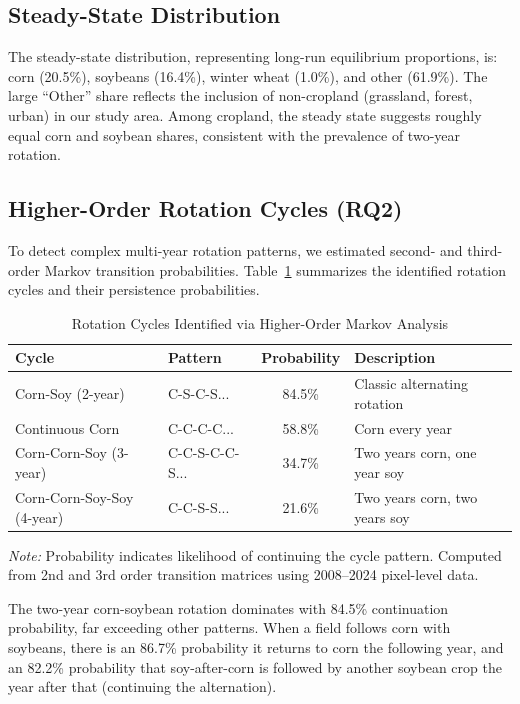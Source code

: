 \documentclass[12pt, a4paper]{article}
\begin{document}
\subsection{Steady-State Distribution}

The steady-state distribution, representing long-run equilibrium proportions, is: corn (20.5\%), soybeans (16.4\%), winter wheat (1.0\%), and other (61.9\%). The large ``Other'' share reflects the inclusion of non-cropland (grassland, forest, urban) in our study area. Among cropland, the steady state suggests roughly equal corn and soybean shares, consistent with the prevalence of two-year rotation.

\subsection{Higher-Order Rotation Cycles (RQ2)}

To detect complex multi-year rotation patterns, we estimated second- and third-order Markov transition probabilities. Table~\ref{tab:rotation_cycles} summarizes the identified rotation cycles and their persistence probabilities.

\begin{table}[H]
\centering
\caption{Rotation Cycles Identified via Higher-Order Markov Analysis}
\label{tab:rotation_cycles}
\begin{tabular}{l l c l}
\toprule
\textbf{Cycle} & \textbf{Pattern} & \textbf{Probability} & \textbf{Description} \\
\midrule
Corn-Soy (2-year) & C-S-C-S... & 84.5\% & Classic alternating rotation \\
Continuous Corn & C-C-C-C... & 58.8\% & Corn every year \\
Corn-Corn-Soy (3-year) & C-C-S-C-C-S... & 34.7\% & Two years corn, one year soy \\
Corn-Corn-Soy-Soy (4-year) & C-C-S-S... & 21.6\% & Two years corn, two years soy \\
\bottomrule
\end{tabular}
\vspace{0.2cm}
\small
\textit{Note:} Probability indicates likelihood of continuing the cycle pattern. Computed from 2nd and 3rd order transition matrices using 2008--2024 pixel-level data.
\end{table}

The two-year corn-soybean rotation dominates with 84.5\% continuation probability, far exceeding other patterns. When a field follows corn with soybeans, there is an 86.7\% probability it returns to corn the following year, and an 82.2\% probability that soy-after-corn is followed by another soybean crop the year after that (continuing the alternation).
\end{document}
